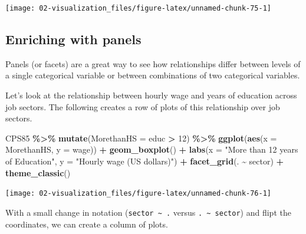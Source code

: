 \documentclass[
]{book}
\newenvironment{Shaded}{\begin{snugshade}}{\end{snugshade}}
\newcommand{\AttributeTok}[1]{\textcolor[rgb]{0.13,0.29,0.53}{#1}}
\newcommand{\DecValTok}[1]{\textcolor[rgb]{0.00,0.00,0.81}{#1}}
\newcommand{\FunctionTok}[1]{\textcolor[rgb]{0.13,0.29,0.53}{\textbf{#1}}}
\newcommand{\NormalTok}[1]{#1}
\newcommand{\SpecialCharTok}[1]{\textcolor[rgb]{0.81,0.36,0.00}{\textbf{#1}}}
\newcommand{\StringTok}[1]{\textcolor[rgb]{0.31,0.60,0.02}{#1}}
\begin{document}
\begin{center}\texttt{[image: 02-visualization\_files/figure-latex/unnamed-chunk-75-1]} \end{center}

\subsection{Enriching with panels}\label{enriching-with-panels}

Panels (or facets) are a great way to see how relationships differ between levels of a single categorical variable or between combinations of two categorical variables.

Let's look at the relationship between hourly wage and years of education across job sectors. The following creates a row of plots of this relationship over job sectors.

\begin{Shaded}
\begin{Highlighting}[]
\NormalTok{CPS85 }\SpecialCharTok{\%\textgreater{}\%}
    \FunctionTok{mutate}\NormalTok{(}\AttributeTok{MorethanHS =}\NormalTok{ educ }\SpecialCharTok{\textgreater{}} \DecValTok{12}\NormalTok{) }\SpecialCharTok{\%\textgreater{}\%} 
    \FunctionTok{ggplot}\NormalTok{(}\FunctionTok{aes}\NormalTok{(}\AttributeTok{x =}\NormalTok{ MorethanHS, }\AttributeTok{y =}\NormalTok{ wage)) }\SpecialCharTok{+}
    \FunctionTok{geom\_boxplot}\NormalTok{() }\SpecialCharTok{+}
    \FunctionTok{labs}\NormalTok{(}\AttributeTok{x =} \StringTok{"More than 12 years of Education"}\NormalTok{, }\AttributeTok{y =} \StringTok{"Hourly wage (US dollars)"}\NormalTok{) }\SpecialCharTok{+}
    \FunctionTok{facet\_grid}\NormalTok{(. }\SpecialCharTok{\textasciitilde{}}\NormalTok{ sector) }\SpecialCharTok{+}
    \FunctionTok{theme\_classic}\NormalTok{()}
\end{Highlighting}
\end{Shaded}

\begin{center}\texttt{[image: 02-visualization\_files/figure-latex/unnamed-chunk-76-1]} \end{center}

With a small change in notation (\texttt{sector\ \textasciitilde{}\ .} versus \texttt{.\ \textasciitilde{}\ sector}) and flipt the coordinates, we can create a column of plots.
\end{document}
